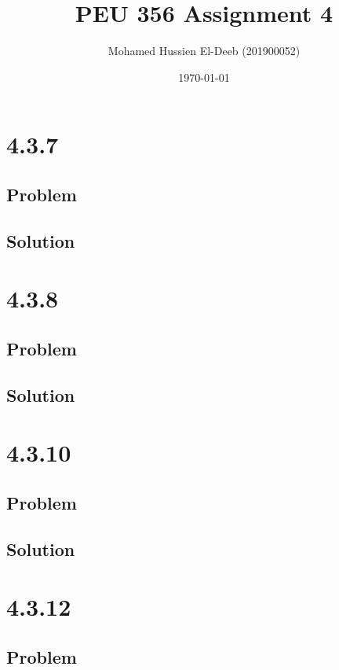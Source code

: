 \documentclass[12pt]{article}
\title{PEU 356 Assignment 4}
\author{Mohamed Hussien El-Deeb (201900052)}
\date{\today}
\begin{document}
\maketitle
\tableofcontents
\hypersetup{linkcolor=RoyalBlue4}

\newpage
\section{4.3.7}

\subsection{Problem}

\subsection{Solution}

\newpage
\section{4.3.8}

\subsection{Problem}

\subsection{Solution}

\newpage
\section{4.3.10}

\subsection{Problem}

\subsection{Solution}

\newpage
\section{4.3.12}

\subsection{Problem}
\end{document}
